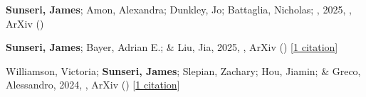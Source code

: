 \item \textbf{Sunseri, James}; Amon, Alexandra; Dunkley, Jo; Battaglia, Nicholas; \etal, 2025, , ArXiv ()

\item \textbf{Sunseri, James}; Bayer, Adrian E.; \& Liu, Jia, 2025, , ArXiv () [\href{https://ui.adsabs.harvard.edu/abs/2025arXiv250311778S}{1 citation}]

\item Williamson, Victoria; \textbf{Sunseri, James}; Slepian, Zachary; Hou, Jiamin; \& Greco, Alessandro, 2024, , ArXiv () [\href{https://ui.adsabs.harvard.edu/abs/2024arXiv241203967W}{1 citation}]